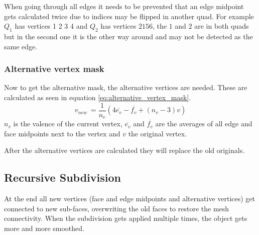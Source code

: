 \documentclass[11.5pt,oneside,a4paper]{scrartcl}
\newcounter{ct}
\begin{document}
When going through all edges it needs to be prevented that an edge midpoint gets calculated twice due to indices may be flipped in another quad. For example $Q_1$ has vertices 1 2 3 4 and $Q_2$ has vertices $2 1 5 6$, the $1$ and $2$ are in both quads but in the second one it is the other way around and may not be detected as the same edge.

\vspace{0.2cm}

\subsubsection{Alternative vertex mask}
Now to get the alternative mask, the alternative vertices are needed. These are calculated as seen in equation \ref{eq:alternative_vertex_mask}.
\begin{equation} \label{eq:alternative_vertex_mask}
        v_{new} \ = \frac{1}{n_{v}} ( 4 \overline{e_{v}} - \overline{f_{v}} + (n_{v}-3) v)
\end{equation} 
$n_{v}$ is the valence of the current vertex, $\overline{e_{v}}$ and $\overline{f_{v}}$ are the averages of all edge and face midpoints next to the vertex and $v$ the original vertex.

After the alternative vertices are calculated they will replace the old originals.

\subsection{Recursive Subdivision}
At the end all new vertices (face and edge midpoints and alternative vertices) get connected to new sub-faces, overwriting the old faces to restore the mesh connectivity. When the subdivision gets applied multiple times, the object gets more and more smoothed.
\end{document}
